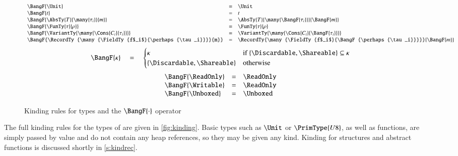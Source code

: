\documentclass[9pt\ifFinal\else,preprint,nocopyrightspace\fi,\ifAlpha\else natbib,authoryear\fi]{sigplanconf}
\begin{document}
\begin{figure}
\begin{displaymath}
\begin{array}{lcl}
      \BangF{\Unit}                                        & = & \Unit \\
      \BangF{t}                                            & = & t \\
      \BangF{\AbsTy{T}{\many{\tau_i}}{m}}                  & = & \AbsTy{T}{\many{\BangF{\tau_i}}}{\BangF{m}} \\
      \BangF{\FunTy{\tau}{\rho}}                           & = & \FunTy{\tau}{\rho} \\
\BangF{\VariantTy{\many{\Cons{C_i}{\tau_i}}}}        & = & \VariantTy{\many{\Cons{C_i}{\BangF{\tau_i}}}} \\
      \BangF{\RecordTy{\many{\FieldTy{f$_i$}{\perhaps{\tau_i}}}}{m}} & = & \RecordTy{\many{\FieldTy{f$_i$}{\BangF{\perhaps{\tau_i}}}}}{\BangF{m}} \\
    \end{array}
  \end{displaymath}
  \boxlabel{$\BangF{\cdot} : \kappa \rightarrow \kappa$}
  \begin{displaymath}
     \BangF{\kappa} \quad = \quad \begin{cases}
                                     \kappa                        & \text{if}\ \{\Discardable, \Shareable\} \subseteq \kappa \\
                                     \{\Discardable, \Shareable\}  & \text{otherwise}
                                  \end{cases}
  \end{displaymath}
  \begin{displaymath}
    \begin{array}{lcl}
      \BangF{\ReadOnly}                                       & = & \ReadOnly\\
      \BangF{\Writable}                                       & = & \ReadOnly\\
      \BangF{\Unboxed}                                        & = & \Unboxed \\
    \end{array}
  \end{displaymath}
\caption{Kinding rules for \CDSL types and the $\BangF{\cdot}$ operator}
\label{fig:kinding}
\end{figure}

The full kinding rules for the types of \CDSL are given in \autoref{fig:kinding}. Basic types such as $\Unit$ or $\PrimType{U8}$, as well as functions,
are simply passed by value and do not contain any heap references, so they may be given any kind. Kinding for structures and abstract functions is discussed
shortly in \autoref{s:kindrec}.
\end{document}
